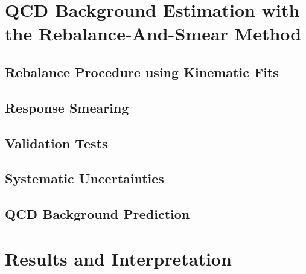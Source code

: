 
\section{QCD Background Estimation with the Rebalance-And-Smear Method}
\label{subsec:RA2_QCD}

\subsection{Rebalance Procedure using Kinematic Fits}
\label{subsec:RA2_reb}

\subsection{Response Smearing}
\label{subsec:RA2_smear}

\subsection{Validation Tests}
\label{subsec:RA2_clsoure}

\subsection{Systematic Uncertainties}
\label{subsec:RA2_syst_unc}

\subsection{QCD Background Prediction}
\label{subsec:RA2_qcd_pred}

\section{Results and Interpretation}
\label{sec:RA2_results}

